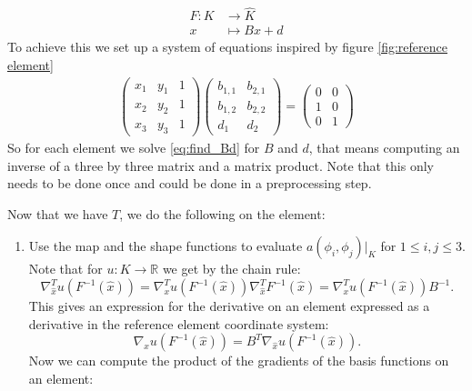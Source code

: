 \documentclass[../Main/main.tex]{subfiles}
\begin{document}
\begin{enumerate}
		\begin{equation}
			\begin{aligned}
				F: K &\rightarrow \hat{K}\\
				x &\mapsto B x + d
			\end{aligned}
		\end{equation}
		To achieve this we set up a system of equations inspired by figure \ref{fig:reference element}
		\begin{gather}\label{eq:find_Bd}
			\begin{pmatrix}
				x_1 & y_1 & 1\\ 
				x_2 & y_2 & 1\\ 
				x_3 & y_3 & 1
			\end{pmatrix}\begin{pmatrix}
				b_{1,1} & b_{2,1}\\ 
				b_{1,2} & b_{2,2}\\ 
				d_1 & d_2
			\end{pmatrix}=
			\begin{pmatrix}
				0 &0 \\ 
				1& 0\\ 
				0 &1 
			\end{pmatrix}
		\end{gather}
		So for each element we solve \eqref{eq:find_Bd} for $B$ and $d$, that means computing an inverse of a three by three matrix and a matrix product. Note that this only needs to be done once and could be done in a preprocessing step. \par
		Now that we have $T$, we do the following on the element:
		\begin{enumerate}
					\item Use the map and the shape functions to evaluate $a(\phi_i,\phi_j)|_K$  for $1\leq i,j \leq 3$. Note that for $u: K \rightarrow \mathbb{R}$ we get by the chain rule:
			\begin{equation}
				\nabla^T_{\hat{x}} u(F^{-1}(\hat{x})) = \nabla^T_{x}u(F^{-1}(\hat{x}))\nabla^T_{\hat{x}} F^{-1}(\hat{x}) =\nabla^T_{x}u(F^{-1}(\hat{x})) B^{-1}.
			\end{equation}
			This gives an expression for the derivative on an element expressed as a derivative in the reference element coordinate system:
			\begin{equation}
				\nabla_{x}u(F^{-1}(\hat{x})) = B^T \nabla_{\hat{x}} u(F^{-1}(\hat{x})).
			\end{equation}
			Now we can compute the product of the gradients of the basis functions on an element:
			\begin{equation}\label{eq:elementgradient}

\end{equation}
\end{enumerate}
\end{enumerate}
\end{document}
